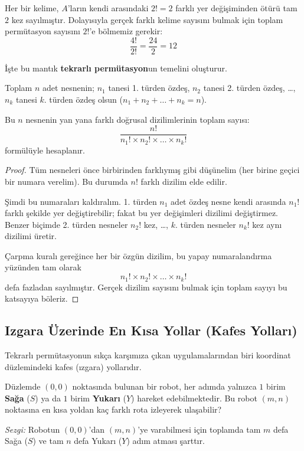 Her bir kelime, $A$'ların kendi arasındaki $2! = 2$ farklı yer değişiminden ötürü tam $2$ kez sayılmıştır. Dolayısıyla gerçek farklı kelime sayısını bulmak için toplam permütasyon sayısını $2!$'e bölmemiz gerekir:
\[ \frac{4!}{2!} = \frac{24}{2} = 12 \]

İşte bu mantık \textbf{tekrarlı permütasyon}un temelini oluşturur.

\begin{theorem}
Toplam $n$ adet nesnenin;
$n_1$ tanesi 1. türden özdeş,
$n_2$ tanesi 2. türden özdeş,
\dots,
$n_k$ tanesi $k$. türden özdeş olsun ($n_1 + n_2 + \dots + n_k = n$).

Bu $n$ nesnenin yan yana farklı doğrusal dizilimlerinin toplam sayısı:
\[ \frac{n!}{n_1! \times n_2! \times \dots \times n_k!} \]
formülüyle hesaplanır.
\end{theorem}
\begin{proof}
Tüm nesneleri önce birbirinden farklıymış gibi düşünelim (her birine geçici bir numara verelim). Bu durumda $n!$ farklı dizilim elde edilir. 

Şimdi bu numaraları kaldıralım. 1. türden $n_1$ adet özdeş nesne kendi arasında $n_1!$ farklı şekilde yer değiştirebilir; fakat bu yer değişimleri dizilimi değiştirmez. Benzer biçimde 2. türden nesneler $n_2!$ kez, \dots, $k$. türden nesneler $n_k!$ kez aynı dizilimi üretir.

Çarpma kuralı gereğince her bir özgün dizilim, bu yapay numaralandırma yüzünden tam olarak
\[ n_1! \times n_2! \times \dots \times n_k! \]
defa fazladan sayılmıştır. Gerçek dizilim sayısını bulmak için toplam sayıyı bu katsayıya böleriz.
\end{proof}

\subsection{Izgara Üzerinde En Kısa Yollar (Kafes Yolları)}

Tekrarlı permütasyonun sıkça karşımıza çıkan uygulamalarından biri koordinat düzlemindeki kafes (ızgara) yollarıdır.

Düzlemde $(0, 0)$ noktasında bulunan bir robot, her adımda yalnızca $1$ birim \textbf{Sağa} ($S$) ya da $1$ birim \textbf{Yukarı} ($Y$) hareket edebilmektedir. Bu robot $(m, n)$ noktasına en kısa yoldan kaç farklı rota izleyerek ulaşabilir?

\begin{center}
\textit{Sezgi:} Robotun $(0, 0)$'dan $(m, n)$'ye varabilmesi için toplamda tam $m$ defa Sağa ($S$) ve tam $n$ defa Yukarı ($Y$) adım atması şarttır. 
\end{center}

